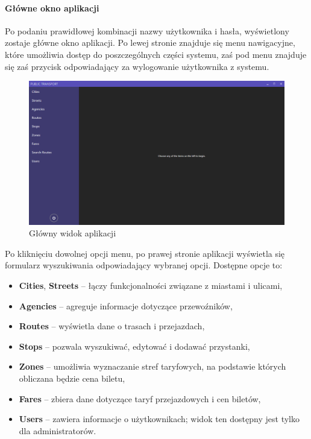 \documentclass[10pt,a4paper]{article}
\begin{document}
\paragraph{Główne okno aplikacji}
Po podaniu prawidłowej kombinacji nazwy użytkownika i hasła, wyświetlony zostaje główne okno aplikacji. Po lewej stronie znajduje się menu nawigacyjne, które umożliwia dostęp do poszczególnych części systemu, zaś pod menu znajduje się zaś przycisk odpowiadający za wylogowanie użytkownika z systemu.
\begin{figure}[H]
	\centering
	\includegraphics[width=15cm]{Resources/Images/02_main_window.png}
	\caption{Główny widok aplikacji}
\end{figure}
Po kliknięciu dowolnej opcji menu, po prawej stronie aplikacji wyświetla się formularz wyszukiwania odpowiadający wybranej opcji. Dostępne opcje to:
\begin{itemize}
	\item \textbf{Cities}, \textbf{Streets} -- łączy funkcjonalności związane z miastami i ulicami,
	\item \textbf{Agencies} -- agreguje informacje dotyczące przewoźników,
	\item \textbf{Routes} -- wyświetla dane o trasach i przejazdach,
	\item \textbf{Stops} -- pozwala wyszukiwać, edytować i dodawać przystanki,
	\item \textbf{Zones} -- umożliwia wyznaczanie stref taryfowych, na podstawie których obliczana będzie cena biletu,
	\item \textbf{Fares} -- zbiera dane dotyczące taryf przejazdowych i cen biletów,
	\item \textbf{Users} -- zawiera informacje o użytkownikach; widok ten dostępny jest tylko dla administratorów.
\end{itemize}
\end{document}

